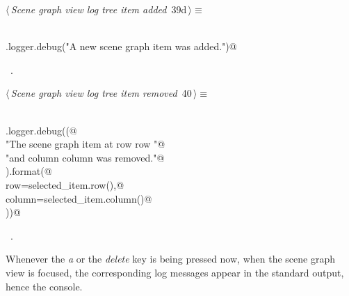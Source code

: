 \documentclass[
    a4paper,      %
    10pt,         %
    openright,    %
    notitlepage,  %
    parskip=half, %
]{scrreprt}       %
\theoremstyle{definition}                    %
\begin{document}
\begin{flushleft} \small
\begin{minipage}{\linewidth}\label{scrap51}\raggedright\small
{} $\langle\,${\itshape Scene graph view log tree item added}\nobreak\ {\footnotesize {39d}}$\,\rangle\equiv$
\vspace{-1exm}
\begin{list}{}{} \item
\mbox{}\lstinline@@\\
\mbox{}\lstinline@self.logger.debug("A new scene graph item was added.")@\\
\mbox{}\lstinline@@{\NWsep}
\end{list}
\vspace{-1.5ex}
\footnotesize
\begin{list}{}{\setlength{\itemsep}{-\parsep}\setlength{\itemindent}{-\leftmargin}}
\item \NWtxtMacroRefIn\ .

\item{}
\end{list}
\end{minipage}\vspace{4ex}
\end{flushleft}
\begin{flushleft} \small
\begin{minipage}{\linewidth}\label{scrap52}\raggedright\small
{} $\langle\,${\itshape Scene graph view log tree item removed}\nobreak\ {\footnotesize {40}}$\,\rangle\equiv$
\vspace{-1exm}
\begin{list}{}{} \item
\mbox{}\lstinline@@\\
\mbox{}\lstinline@self.logger.debug((@\\
\mbox{}\lstinline@    "The scene graph item at row {row} "@\\
\mbox{}\lstinline@    "and column {column} was removed."@\\
\mbox{}\lstinline@).format(@\\
\mbox{}\lstinline@    row=selected_item.row(),@\\
\mbox{}\lstinline@    column=selected_item.column()@\\
\mbox{}\lstinline@))@\\
\mbox{}\lstinline@@{\NWsep}
\end{list}
\vspace{-1.5ex}
\footnotesize
\begin{list}{}{\setlength{\itemsep}{-\parsep}\setlength{\itemindent}{-\leftmargin}}
\item \NWtxtMacroRefIn\ .

\item{}
\end{list}
\end{minipage}\vspace{4ex}
\end{flushleft}
Whenever the \textit{a} or the \textit{delete} key is being pressed now, when
the scene graph view is focused, the corresponding log messages appear in the
standard output, hence the console.
\end{document}
